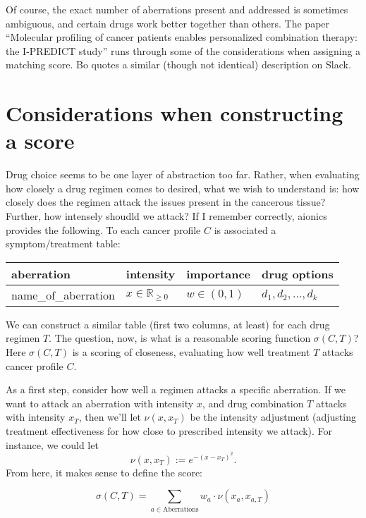 \documentclass[titlepage, hidelinks, 12pt]{article}
\theoremstyle{plain}
\theoremstyle{remark}
\theoremstyle{definition}
\newcommand{\R}{\mathbb{R}}
\begin{document}
Of course, the exact number of aberrations present and addressed is sometimes ambiguous, and certain drugs work better together than others.
The paper ``Molecular profiling of cancer patients enables personalized combination therapy: the I-PREDICT study'' runs through some of the
considerations when assigning a matching score. Bo quotes a similar (though not identical) description on Slack. 













\section{Considerations when constructing a score}
Drug choice seems to be one layer of abstraction too far. Rather, when evaluating how closely a drug regimen comes to desired, what we
wish to understand is: how closely does the regimen attack the issues present in the cancerous tissue? Further, how intensely shoudld we attack?
If I remember correctly, aionics provides the following. To each cancer profile $C$ is associated a symptom/treatment table: 

\begin{table}[h]
    \centering
\begin{tabular}{l|l|l|l}
aberration           & intensity       & importance   & drug options            \\\hline
name\_of\_aberration & $x\in\R_{\ge0}$ & $w\in(0, 1)$ & $d_1, d_2, \ldots, d_k$ \\
\end{tabular}
\end{table}

We can construct a similar table (first two columns, at least) for each drug regimen $T$. 
The question, now, is what is a reasonable scoring function $\sigma(C, T)$? Here $\sigma(C, T)$ is a scoring of closeness, evaluating
how well treatment $T$ attacks cancer profile $C$. 

As a first step, consider how well a regimen attacks a specific aberration. If we want to attack an aberration with
intensity $x$, and drug combination $T$ attacks with intensity $x_T$, then we'll let $\nu(x, x_T)$ be the intensity adjustment (adjusting
treatment effectiveness for how close to prescribed intensity we attack). For instance, we could let
\begin{equation}
    \nu(x, x_T) := e^{-(x-x_T)^2}.
    \label{eqn:intensityAdjustment}
\end{equation}
From here, it makes sense to define the score:

\begin{equation}
    \sigma(C, T) = \sum\limits_{a\in\text{Aberrations}} w_a\cdot \nu(x_a, x_{a,T})
    \label{eqn:ourMatchingScore}
\end{equation}
\end{document}
